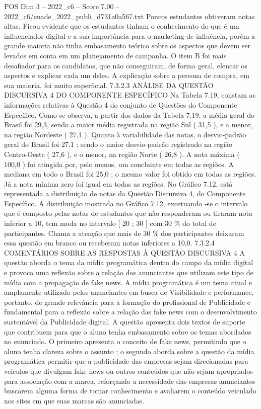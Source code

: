 \begin{textsample}{POS Dim 3 – 2022\_c6 – Score 7.00 – 2022\_c6/enade\_2022\_publi\_d731a0a567.txt}
Poucos estudantes obtiveram notas altas.
Ficou evidente que os estudantes tinham o conhecimento do que é um influenciador digital e a sua importância para o marketing de influência, porém a grande maioria não tinha embasamento teórico sobre os aspectos que devem ser levados em conta em um planejamento de campanha.
O item B foi mais desafiador para os candidatos, que não conseguiram, de forma geral, elencar os aspectos e explicar cada um deles.
A explicação sobre a persona de compra, em sua maioria, foi muito superficial. 7.3.2.3 ANÁLISE DA QUESTÃO DISCURSIVA 4 DO COMPONENTE ESPECÍFICO Na Tabela 7.19, constam as informações relativas à Questão 4 do conjunto de Questões do Componente Específico.
Como se observa, a partir dos dados da Tabela 7.19, a média geral do Brasil foi 29,3, sendo a maior média registrada na região Sul ( 31,5 ), e a menor, na região Nordeste ( 27,1 ).
Quanto à variabilidade das notas, o desvio-padrão geral do Brasil foi 27,1 ; sendo o maior desvio-padrão registrado na região Centro-Oeste ( 27,6 ), e o menor, na região Norte ( 26,8 ).
A nota máxima ( 100,0 ) foi atingida por, pelo menos, um concluinte em todas as regiões.
A mediana em todo o Brasil foi 25,0 ; o mesmo valor foi obtido em todas as regiões.
Já a nota mínima zero foi igual em todas as regiões.
No Gráfico 7.12, está representada a distribuição de notas da Questão Discursiva 4, do Componente Específico.
A distribuição mostrada no Gráfico 7.12, excetuando -se o intervalo que é composto pelas notas de estudantes que não responderam ou tiraram nota inferior a 10, tem moda no intervalo [ 20 ; 30 ] com 30 \% do total de participantes.
Chama a atenção que mais de 30 \% dos participantes deixaram essa questão em branco ou receberam notas inferiores a 10,0. 7.3.2.4 COMENTÁRIOS SOBRE AS RESPOSTAS À QUESTÃO DISCURSIVA 4 A questão aborda o tema da mídia programática dentro do campo da mídia digital e provoca uma reflexão sobre a relação dos anunciantes que utilizam este tipo de mídia com a propagação de fake news.
A mídia programática é um tema atual e amplamente utilizado pelos anunciantes em busca de Visibilidade e performance, portanto, de grande relevância para a formação do profissional de Publicidade e fundamental para a reflexão sobre a relação das fake news com o desenvolvimento sustentável da Publicidade digital.
A questão apresenta dois textos de suporte que contribuem para que o aluno tenha embasamento sobre os temas abordados no enunciado.
O primeiro apresenta o conceito de fake news, permitindo que o aluno tenha clareza sobre o assunto ; o segundo aborda sobre a questão da mídia programática permitir que a publicidade das empresas sejam direcionadas para veículos que divulgam fake news ou outros conteúdos que não sejam apropriados para associação com a marca, reforçando a necessidade das empresas anunciantes buscarem alguma forma de tomar conhecimento e avaliarem o conteúdo veiculado nos sites em que suas marcas são anunciadas.

\end{textsample}

